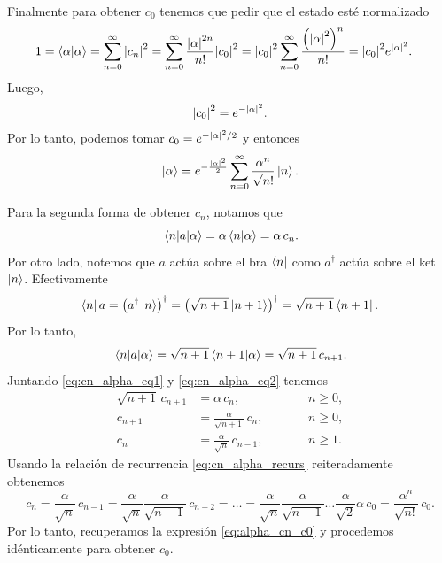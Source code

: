 \documentclass[10pt, a4paper]{article}
\numberwithin{equation}{subsection}
\begin{document}
Finalmente para obtener $c_0$ tenemos que pedir que el estado esté normalizado
\begin{align}
  1 = \braket{\alpha}{\alpha} &= \sum_{n=0}^{\infty} \abs{c_n}^2
    = \sum_{n=0}^{\infty} \frac{\abs{\alpha}^{2n}}{n!}\abs{c_0}^2
    = \abs{c_0}^2 \sum_{n=0}^{\infty}
    \frac{\left(\abs{\alpha}^{2}\right)^n}{n!}
    = \abs{c_0}^2 e^{\abs{\alpha}^2}.
\end{align}
Luego,
\begin{equation}
  \abs{c_0}^2 = e^{-\abs{\alpha}^2}.
\end{equation}
Por lo tanto, podemos tomar $c_0 = e^{-\abs{\alpha}^2/2}$ y entonces
\begin{equation} \label{eq:alpha_n_basis}
  \ket{\alpha} = e^{-\frac{\abs{\alpha}^2}{2}} \sum_{n=0}^{\infty}
    \frac{\alpha^n}{\sqrt{n!}} \ket{n}.
\end{equation}

\bigbreak

Para la segunda forma de obtener $c_n$, notamos que
\begin{equation} \label{eq:cn_alpha_eq2}
  \matrixel{n}{a}{\alpha} = \alpha\braket{n}{\alpha} = \alpha\,c_n.
\end{equation}
Por otro lado, notemos que $a$ actúa sobre el bra $\bra{n}$ como $a^\dagger$
actúa sobre el ket $\ket{n}$. Efectivamente
\begin{equation}
  \bra{n}a = \left(a^\dagger\ket{n}\right)^\dagger =
    \left(\sqrt{n+1}\ket{n+1}\right)^\dagger = \sqrt{n+1}\bra{n+1}.
\end{equation}
Por lo tanto,
\begin{equation} \label{eq:cn_alpha_eq1}
  \matrixel{n}{a}{\alpha} = \sqrt{n+1}\braket{n+1}{\alpha} =
    \sqrt{n+1}\,c_{n+1}.
\end{equation}
Juntando \eqref{eq:cn_alpha_eq1} y \eqref{eq:cn_alpha_eq2} tenemos
\begin{align}
  \sqrt{n+1}\,c_{n+1} &= \alpha\,c_n, \qquad &&n \geq 0, \\
  c_{n+1} &= \frac{\alpha}{\sqrt{n+1}}\,c_n, \qquad &&n \geq 0, \\
  c_{n} &= \frac{\alpha}{\sqrt{n}}\,c_{n-1}, \qquad &&n \geq 1.
  \label{eq:cn_alpha_recurs}
\end{align}
Usando la relación de recurrencia \eqref{eq:cn_alpha_recurs} reiteradamente
obtenemos
\begin{equation}
  c_{n} = \frac{\alpha}{\sqrt{n}}\, c_{n-1} = \frac{\alpha}{\sqrt{n}}
    \frac{\alpha}{\sqrt{n-1}}\, c_{n-2} = \dots = \frac{\alpha}{\sqrt{n}}
    \frac{\alpha}{\sqrt{n-1}} \dots \frac{\alpha}{\sqrt{2}} \alpha\, c_{0} =
    \frac{\alpha^n}{\sqrt{n!}}\, c_{0}.
\end{equation}
Por lo tanto, recuperamos la expresión \eqref{eq:alpha_cn_c0} y procedemos
idénticamente para obtener $c_0$.
\end{document}
